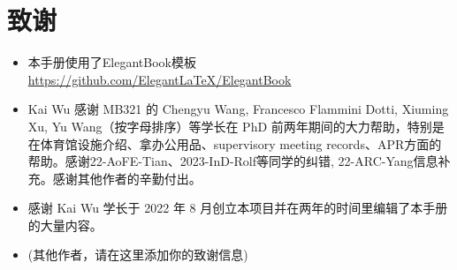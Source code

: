 \chapter{致谢}
\begin{itemize}
    \item 本手册使用了ElegantBook模板 \url{https://github.com/ElegantLaTeX/ElegantBook}
    \item Kai Wu 感谢 MB321 的 Chengyu Wang, Francesco Flammini Dotti, Xiuming Xu, Yu Wang（按字母排序）等学长在 PhD 前两年期间的大力帮助，特别是在体育馆设施介绍、拿办公用品、supervisory meeting records、APR方面的帮助。感谢22-AoFE-Tian、2023-InD-Rolf等同学的纠错, 22-ARC-Yang信息补充。感谢其他作者的辛勤付出。
    \item \Shiyao \space 感谢 Kai Wu 学长于 2022 年 8 月创立本项目并在两年的时间里编辑了本手册的大量内容。
    \item (其他作者，请在这里添加你的致谢信息)
\end{itemize}


